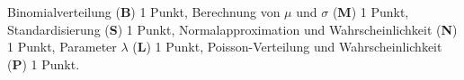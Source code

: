 \begin{bewertung}
Binomialverteilung ({\bf B}) 1 Punkt,
Berechnung von $\mu$ und $\sigma$ ({\bf M}) 1 Punkt,
Standardisierung ({\bf S}) 1 Punkt,
Normalapproximation und Wahrscheinlichkeit ({\bf N}) 1 Punkt,
Parameter $\lambda$ ({\bf L}) 1 Punkt,
Poisson-Verteilung und Wahrscheinlichkeit ({\bf P}) 1 Punkt.
\end{bewertung}

